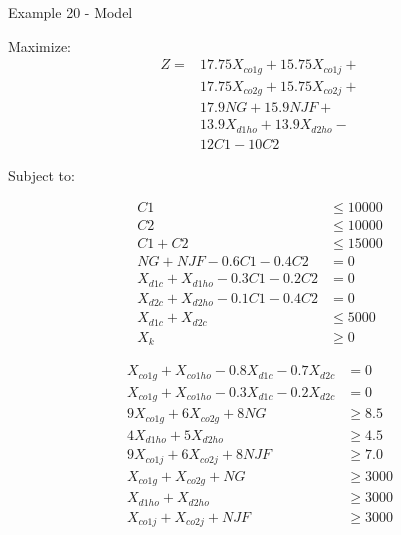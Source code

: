 \begin{frame}{Example 20 - Model}

Maximize:
\begin{align*}
    Z =& 17.75X_{co1g} + 15.75X_{co1j} + \\
       & 17.75X_{co2g} + 15.75X_{co2j} + \\
       & 17.9NG + 15.9NJF + \\
       & 13.9X_{d1ho} + 13.9X_{d2ho} - \\
       & 12C1 - 10C2
\end{align*}

Subject to:
\vspace{-1cm}
\begin{multicols}{2}
\tiny{
\begin{align*}
    C1 &\le 10000 \\
    C2 &\le 10000 \\
    C1 + C2 &\le 15000 \\
    NG + NJF - 0.6C1 - 0.4C2 &= 0 \\
    X_{d1c} + X_{d1ho} - 0.3C1 - 0.2C2 &= 0 \\
    X_{d2c} + X_{d2ho} - 0.1C1 - 0.4C2 &= 0 \\
    X_{d1c} + X_{d2c} &\le 5000 \\
    X_{k} &\ge 0
\end{align*}
}

\vfill
\columnbreak

\tiny{
\begin{align*}
    X_{co1g} + X_{co1ho} - 0.8X_{d1c} - 0.7X_{d2c} &= 0 \\
    X_{co1g} + X_{co1ho} - 0.3X_{d1c} - 0.2X_{d2c} &= 0 \\
    9X_{co1g} + 6X_{co2g} + 8NG &\ge 8.5 \\
    4X_{d1ho} + 5X_{d2ho} &\ge 4.5 \\
    9X_{co1j} + 6X_{co2j} + 8NJF &\ge 7.0 \\
    X_{co1g} + X_{co2g} + NG &\ge 3000 \\
    X_{d1ho} + X_{d2ho} &\ge 3000 \\
    X_{co1j} + X_{co2j} + NJF &\ge 3000
\end{align*}
}
\end{multicols}

\end{frame}
